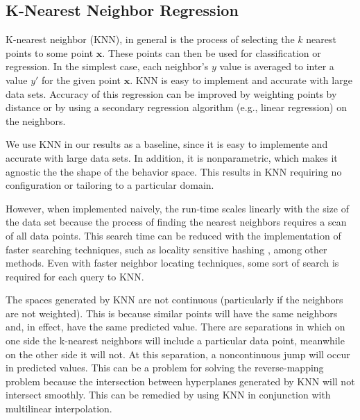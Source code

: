 \subsection{K-Nearest Neighbor Regression}
K-nearest neighbor (KNN), in general is the process of selecting the $k$ nearest points to some point $\mathbf x$.
These points can then be used for classification or regression.
In the simplest case, each neighbor's $y$ value is averaged to inter a value $y'$ for the given point $\mathbf x$.
KNN is easy to implement and accurate with large data sets.
Accuracy of this regression can be improved by weighting points by distance or by using a secondary regression algorithm (e.g., linear regression) on the neighbors.

We use KNN in our results as a baseline, since it is easy to implemente and accurate with large data sets.
In addition, it is nonparametric, which makes it agnostic the the shape of the behavior space.
This results in KNN requiring no configuration or tailoring to a particular domain.

However, when implemented naively, the run-time scales linearly with the size of the data set because the process of finding the nearest neighbors requires a scan of all data points.
This search time can be reduced with the implementation of faster searching techniques, such as locality sensitive hashing \cite{gionis1999similarity}, among other methods.
Even with faster neighbor locating techniques, some sort of search is required for each query to KNN.

The spaces generated by KNN are not continuous (particularly if the neighbors are not weighted).
This is because similar points will have the same neighbors and, in effect, have the same predicted value.
There are separations in which on one side the k-nearest neighbors will include a particular data point, meanwhile on the other side it will not.
At this separation, a noncontinuous jump will occur in predicted values.
This can be a problem for solving the reverse-mapping problem because the intersection between hyperplanes generated by KNN will not intersect smoothly.
This can be remedied by using KNN in conjunction with multilinear interpolation.
      
